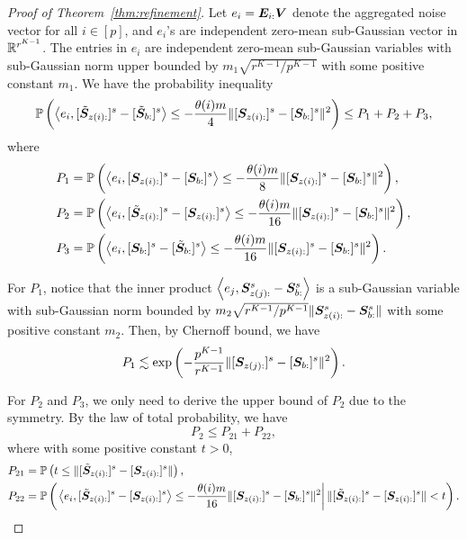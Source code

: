 \documentclass[lettersize,onecolumn,journal]{IEEEtran}
\theoremstyle{definition}
\theoremstyle{definition}
\newcommand{\of}[1]{\left(#1\right)}
\newcommand{\ang}[1]{\left\langle#1\right\rangle}
\begin{document}
\begin{proof}[Proof of Theorem~\ref{thm:refinement}]
    Let $e_i = \bm{E}_{i:} \bm{V}$ denote the aggregated noise vector for all $i \in [p]$, and $e_i$'s are independent zero-mean sub-Gaussian vector in $\mathbb{R}^{r^{K-1}}$. The entries in $e_i$ are independent zero-mean sub-Gaussian variables with sub-Gaussian norm upper bounded by $m_1\sqrt{r^{K-1}/p^{K-1}}$ with some positive constant $m_1$. We have the probability inequality
    \begin{align}
        \bbP \of{ \ang{ e_i, [  \tilde \mS_{z(i):} ]^s - [  \tilde \mS_{b:} ]^s }  \leq - \frac{ \theta(i) m}{4} \onormSize{}{ [ \mS_{z(i):}  ]^s - [ \mS_{b:}  ]^s  }^2} \leq P_1 + P_2 + P_3,
    \end{align}
    where 
    \begin{align}
        P_1 &= \bbP \of{ \ang{e_i, [  \mS_{z(i):} ]^s - [ \mS_{b:} ]^s} \leq -\frac{\theta(i)m}{8}  \onormSize{}{ [ \mS_{z(i):}  ]^s - [ \mS_{b:}  ]^s  }^2 }, \\
        P_2 &= \bbP \of{ \ang{e_i, [ \tilde  \mS_{z(i):} ]^s - [ \mS_{z(i):} ]^s} \leq -\frac{\theta(i)m}{16}  \onormSize{}{ [ \mS_{z(i):}  ]^s - [ \mS_{b:}  ]^s  }^2 },\\
        P_3 &= \bbP \of{ \ang{e_i, [  \mS_{b:} ]^s - [\tilde  \mS_{b:} ]^s} \leq -\frac{\theta(i)m}{16}   \onormSize{}{ [ \mS_{z(i):}  ]^s - [ \mS_{b:}  ]^s  }^2 }.
    \end{align}
    
    For $P_1$, notice that the inner product $\ang{e_j,\mS_{z(j):}^s - \mS_{b:}^s} $ is a sub-Gaussian variable with sub-Gaussian norm bounded by $m_2 \sqrt{ r^{K-1}/ p^{K-1} } \lVert \bm S_{z(i):}^s -  \bm S_{b:}^s \rVert$ with some positive constant $m_2$. Then, by Chernoff bound, we have  
    \begin{equation}\label{eq:p1_2}
         P_1 \lesssim \exp \of{  - \frac{p^{K-1}}{r^{K-1}}   \onormSize{}{ [ \mS_{z(j):}  ]^s - [ \mS_{b:}  ]^s  }^2 }.
    \end{equation}
    
    For $P_2$ and $P_3$, we only need to derive the upper bound of $P_2$ due to the symmetry. By the law of total probability, we have 
    \begin{equation}\label{eq:p2}
        P_2 \leq P_{21} + P_{22},
    \end{equation}
    where with some positive constant $t>0$,
    \begin{align}
        P_{21}& =  \bbP \of{ t \leq   \onormSize{}{ [ \tilde  \mS_{z(i):} ]^s - [ \mS_{z(i):} ]^s }},\\
        P_{22} &= \bbP \of{ \left. \ang{e_i, [ \tilde  \mS_{z(i):} ]^s - [ \mS_{z(i):} ]^s} \leq -\frac{\theta(i)m}{16}  \onormSize{}{ [ \mS_{z(i):}  ]^s - [ \mS_{b:}  ]^s  }^2 \right| \onormSize{}{ [ \tilde  \mS_{z(i):} ]^s - [ \mS_{z(i):} ]^s } < t  }.
    \end{align}
    

\end{proof}
\end{document}
